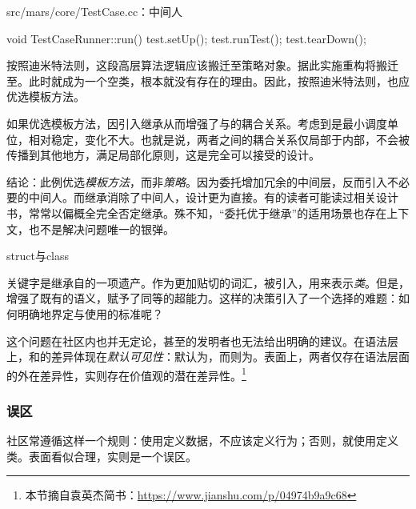 \begin{content}
\begin{nodiff}{src/mars/core/TestCase.cc：中间人}
\begin{c++}
void TestCaseRunner::run() {
  test.setUp();
  test.runTest();
  test.tearDown();
}
\end{c++}
\end{nodiff}

按照迪米特法则，这段高层算法逻辑应该搬迁至策略对象。据此实施重构将搬迁至。此时就成为一个空类，根本就没有存在的理由。因此，按照迪米特法则，也应优选模板方法。

如果优选模板方法，因引入继承从而增强了与的耦合关系。考虑到是最小调度单位，相对稳定，变化不大。也就是说，两者之间的耦合关系仅局部于内部，不会被传播到其他地方，满足局部化原则，这是完全可以接受的设计。

结论：此例优选\emph{模板方法}，而非\emph{策略}。因为委托增加冗余的中间层，反而引入不必要的中间人。而继承消除了中间人，设计更为直接。有的读者可能读过相关设计书，常常以偏概全完全否定继承。殊不知，“委托优于继承”的适用场景也存在上下文，也不是解决问题唯一的银弹。

\begin{episode}{struct与class}
\begin{content}

关键字是\cpp{}继承自\clang{}的一项遗产。作为更加贴切的词汇，被引入\cpp{}，用来表示\emph{类}。但是，\cpp{}增强了既有的语义，赋予了同等的超能力。这样的决策引入了一个选择的难题：如何明确地界定与使用的标准呢？ 

这个问题在社区内也并无定论，甚至\cpp{}的发明者也无法给出明确的建议。在语法层上，和的差异体现在\emph{默认可见性}：默认为，而则为。表面上，两者仅存在语法层面的外在差异性，实则存在价值观的潜在差异性。\footnote{本节摘自袁英杰简书：\href{https://www.jianshu.com/p/04974b9a9c68}{https://www.jianshu.com/p/04974b9a9c68}}

\subsubsection{误区}

社区常遵循这样一个规则：使用定义数据，不应该定义行为；否则，就使用定义类。表面看似合理，实则是一个误区。


\end{content}
\end{episode}
\end{content}

